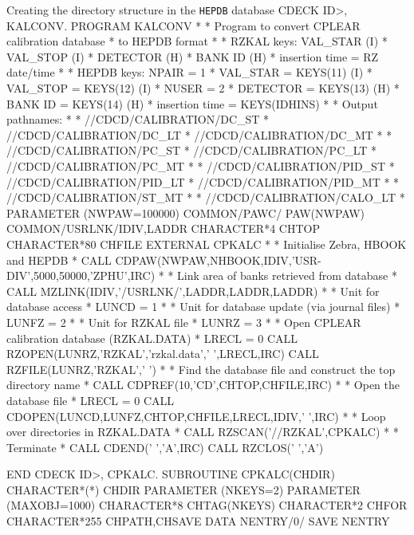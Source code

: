 \begin{XMPt}{Creating the directory structure in the {\tt HEPDB} database}
CDECK  ID>, KALCONV.
      PROGRAM KALCONV
*
*     Program to convert CPLEAR calibration database
*     to HEPDB format
*
*     RZKAL keys: VAL_STAR (I)
*                 VAL_STOP (I)
*                 DETECTOR (H)
*                 BANK ID  (H)
*     insertion time = RZ date/time
*
*     HEPDB keys: NPAIR    = 1
*                 VAL_STAR = KEYS(11) (I)
*                 VAL_STOP = KEYS(12) (I)
*                 NUSER    = 2
*                 DETECTOR = KEYS(13) (H)
*                 BANK ID  = KEYS(14) (H)
*     insertion time = KEYS(IDHINS)
*
*     Output pathnames:
*
*     //CDCD/CALIBRATION/DC_ST
*     //CDCD/CALIBRATION/DC_LT
*     //CDCD/CALIBRATION/DC_MT
*
*     //CDCD/CALIBRATION/PC_ST
*     //CDCD/CALIBRATION/PC_LT
*     //CDCD/CALIBRATION/PC_MT
*
*     //CDCD/CALIBRATION/PID_ST
*     //CDCD/CALIBRATION/PID_LT
*     //CDCD/CALIBRATION/PID_MT
*
*     //CDCD/CALIBRATION/ST_MT
*
*     //CDCD/CALIBRATION/CALO_LT
*
      PARAMETER    (NWPAW=100000)
      COMMON/PAWC/ PAW(NWPAW)
      COMMON/USRLNK/IDIV,LADDR
      CHARACTER*4  CHTOP
      CHARACTER*80 CHFILE
      EXTERNAL     CPKALC
*
*     Initialise Zebra, HBOOK and HEPDB
*
      CALL CDPAW(NWPAW,NHBOOK,IDIV,'USR-DIV',5000,50000,'ZPHU',IRC)
*
*     Link area of banks retrieved from database
*
      CALL MZLINK(IDIV,'/USRLNK/',LADDR,LADDR,LADDR)
*
*     Unit for database access
*
      LUNCD  = 1
*
*     Unit for database update (via journal files)
*
      LUNFZ  = 2
*
*     Unit for RZKAL file
*
      LUNRZ  = 3
*
*     Open CPLEAR calibration database (RZKAL.DATA)
*
      LRECL  = 0
      CALL RZOPEN(LUNRZ,'RZKAL','rzkal.data',' ',LRECL,IRC)
      CALL RZFILE(LUNRZ,'RZKAL',' ')
*
*     Find the database file and construct the top directory name
*
      CALL CDPREF(10,'CD',CHTOP,CHFILE,IRC)
*
*     Open the database file
*
      LRECL  = 0
      CALL CDOPEN(LUNCD,LUNFZ,CHTOP,CHFILE,LRECL,IDIV,' ',IRC)
*
*     Loop over directories in RZKAL.DATA
*
      CALL RZSCAN('//RZKAL',CPKALC)
*
*     Terminate
*
      CALL CDEND(' ','A',IRC)
      CALL RZCLOS(' ','A')

      END
CDECK  ID>, CPKALC.
      SUBROUTINE CPKALC(CHDIR)
      CHARACTER*(*) CHDIR
      PARAMETER    (NKEYS=2)
      PARAMETER    (MAXOBJ=1000)
      CHARACTER*8   CHTAG(NKEYS)
      CHARACTER*2   CHFOR
      CHARACTER*255 CHPATH,CHSAVE
      DATA          NENTRY/0/
      SAVE          NENTRY


\end{XMPt}
